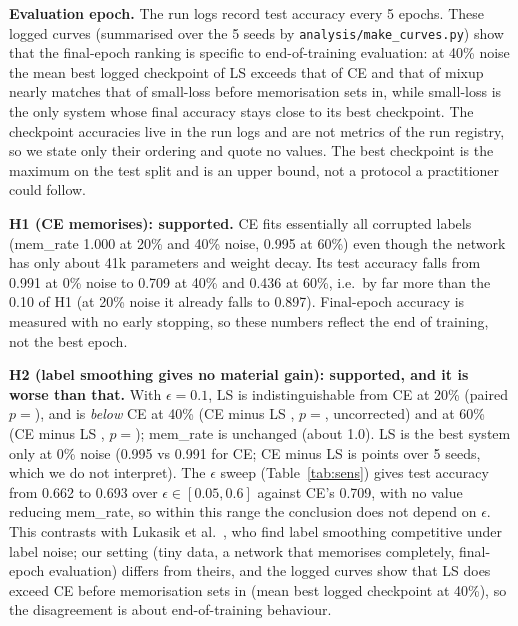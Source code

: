 \textbf{Evaluation epoch.} The run logs record test accuracy every 5 epochs. These logged curves (summarised over the 5 seeds by \texttt{analysis/make\_curves.py}) show that the final-epoch ranking is specific to end-of-training evaluation: at 40\% noise the mean best logged checkpoint of LS exceeds that of CE and that of mixup nearly matches that of small-loss before memorisation sets in, while small-loss is the only system whose final accuracy stays close to its best checkpoint. The checkpoint accuracies live in the run logs and are not metrics of the run registry, so we state only their ordering and quote no values. The best checkpoint is the maximum on the test split and is an upper bound, not a protocol a practitioner could follow.

\textbf{H1 (CE memorises): supported.} CE fits essentially all corrupted labels (mem\_rate 1.000 at 20\% and 40\% noise, 0.995 at 60\%) even though the network has only about 41k parameters and weight decay. Its test accuracy falls from 0.991 at 0\% noise to 0.709 at 40\% and 0.436 at 60\%, i.e.\ by far more than the 0.10 of H1 (at 20\% noise it already falls to 0.897). Final-epoch accuracy is measured with no early stopping, so these numbers reflect the end of training, not the best epoch.

\textbf{H2 (label smoothing gives no material gain): supported, and it is worse than that.} With $\epsilon{=}0.1$, LS is indistinguishable from CE at 20\% (paired $p{=}$), and is \emph{below} CE at 40\% (CE minus LS , $p{=}$, uncorrected) and at 60\% (CE minus LS , $p{=}$); mem\_rate is unchanged (about 1.0). LS is the best system only at 0\% noise (0.995 vs 0.991 for CE; CE minus LS is  points over 5 seeds, which we do not interpret). The $\epsilon$ sweep (Table~\ref{tab:sens}) gives test accuracy from 0.662 to 0.693 over $\epsilon\in[0.05,0.6]$ against CE's 0.709, with no value reducing mem\_rate, so within this range the conclusion does not depend on $\epsilon$. This contrasts with Lukasik et al.~\cite{lukasik2020does}, who find label smoothing competitive under label noise; our setting (tiny data, a network that memorises completely, final-epoch evaluation) differs from theirs, and the logged curves show that LS does exceed CE before memorisation sets in (mean best logged checkpoint at 40\%), so the disagreement is about end-of-training behaviour.

